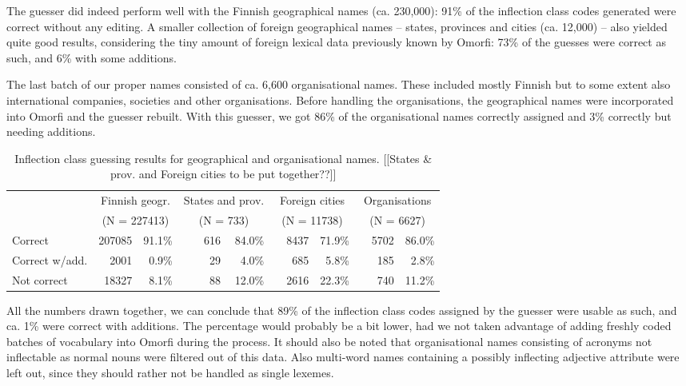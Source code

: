 \documentclass{llncs}
\begin{document}
The guesser did indeed perform well with the Finnish geographical
names (ca. 230,000): 91\% of the inflection class codes generated were
correct without any editing. A smaller collection of foreign
geographical names -- states, provinces and cities (ca. 12,000) --
also yielded quite good results, considering the tiny amount of
foreign lexical data previously known by Omorfi: 73\% of the guesses
were correct as such, and 6\% with some additions.

The last batch of our proper names consisted of ca. 6,600
organisational names. These included mostly Finnish but to some extent
also international companies, societies and other
organisations. Before handling the organisations, the geographical
names were incorporated into Omorfi and the guesser rebuilt. With this
guesser, we got 86\% of the organisational names correctly assigned
and 3\% correctly but needing additions.

\begin{table}
\begin{center}
\begin{tabular}{l|rr|rr|rr|rr}
     & \multicolumn{2}{c|}{Finnish geogr.}  & \multicolumn{2}{c|}{States and prov.}  & \multicolumn{2}{c|}{Foreign cities}  & \multicolumn{2}{c}{Organisations}\\
     & \multicolumn{2}{c|}{(N = 227413)}  & \multicolumn{2}{c|}{(N = 733)}  & \multicolumn{2}{c|}{(N = 11738)}  & \multicolumn{2}{c}{(N = 6627)}\\
\hline
Correct        & 207085 & 91.1\%  & ~~~616  &  84.0\% & ~~8437 &   71.9\% & ~~5702 &   86.0\%\\
Correct w/add. & ~~2001 &  0.9\%  & ~~~~29  &   4.0\% & ~~~685 &    5.8\% & ~~~185 &    2.8\%\\
Not correct    & ~18327 &  8.1\%  & ~~~~88  &  12.0\% & ~~2616 &   22.3\% & ~~~740 &   11.2\%\\
\end{tabular}
\caption{Inflection class guessing results for geographical and organisational names.
[[States \& prov. and Foreign cities to be put together??]]
}\label{tab:lang-id-acc}
\end{center}
\end{table}

All the numbers drawn together, we can conclude that 89\% of the
inflection class codes assigned by the guesser were usable as such,
and ca. 1\% were correct with additions. The percentage would probably
be a bit lower, had we not taken advantage of adding freshly coded
batches of vocabulary into Omorfi during the process. It should also
be noted that organisational names consisting of acronyms not
inflectable as normal nouns were filtered out of this data. Also
multi-word names containing a possibly inflecting adjective attribute
were left out, since they should rather not be handled as single
lexemes.
\end{document}
